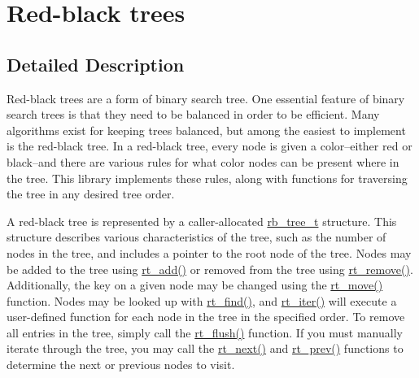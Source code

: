 \hypertarget{group__dbprim__rbtree}{
\section{Red-black trees}
\label{group__dbprim__rbtree}
}


\subsection{Detailed Description}
Red-black trees are a form of binary search tree. One essential feature of binary search trees is that they need to be balanced in order to be efficient. Many algorithms exist for keeping trees balanced, but among the easiest to implement is the red-black tree. In a red-black tree, every node is given a color--either red or black--and there are various rules for what color nodes can be present where in the tree. This library implements these rules, along with functions for traversing the tree in any desired tree order.

A red-black tree is represented by a caller-allocated \hyperlink{group__dbprim__rbtree_ga0}{rb\_\-tree\_\-t} structure. This structure describes various characteristics of the tree, such as the number of nodes in the tree, and includes a pointer to the root node of the tree. Nodes may be added to the tree using \hyperlink{group__dbprim__rbtree_ga6}{rt\_\-add()} or removed from the tree using \hyperlink{group__dbprim__rbtree_ga8}{rt\_\-remove()}. Additionally, the key on a given node may be changed using the \hyperlink{group__dbprim__rbtree_ga7}{rt\_\-move()} function. Nodes may be looked up with \hyperlink{group__dbprim__rbtree_ga9}{rt\_\-find()}, and \hyperlink{group__dbprim__rbtree_ga11}{rt\_\-iter()} will execute a user-defined function for each node in the tree in the specified order. To remove all entries in the tree, simply call the \hyperlink{group__dbprim__rbtree_ga12}{rt\_\-flush()} function. If you must manually iterate through the tree, you may call the \hyperlink{group__dbprim__rbtree_ga10}{rt\_\-next()} and \hyperlink{group__dbprim__rbtree_ga28}{rt\_\-prev()} functions to determine the next or previous nodes to visit.

